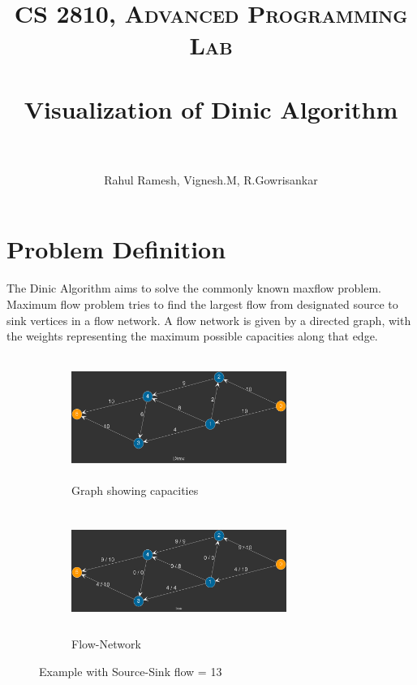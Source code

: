 \documentclass[paper=a4, fontsize=11pt]{scrartcl} %
\title{	
\normalfont \normalsize 
\textsc{CS 2810, Advanced Programming Lab} \\ [25pt] %
\horrule{0.5pt} \\[0.4cm] %
\huge Visualization of Dinic Algorithm\\ %
\horrule{2pt} \\[0.5cm] %
}
\author{Rahul Ramesh, Vignesh.M, R.Gowrisankar} %
\date{} %
\numberwithin{equation}{section} %
\numberwithin{figure}{section} %
\numberwithin{table}{section} %
\begin{document}
\maketitle %


\section{Problem Definition}

The Dinic Algorithm aims to solve the commonly known maxflow problem. Maximum flow problem tries to find the largest flow from designated source to sink vertices in a flow network. A flow network is given by a directed graph, with the weights representing the maximum possible capacities along that edge.

\begin{figure}[h]
\begin{subfigure}{0.5\textwidth}
\includegraphics[width=7cm, height=4cm,center]{p1.png}
\caption{Graph showing capacities}
\label{fig:subim1}
\end{subfigure}
\begin{subfigure}{0.5\textwidth}
\includegraphics[width=7cm, height=4cm,center]{p4.png}
\caption{Flow-Network}
\label{fig:subim2}
\end{subfigure}

\caption{Example with Source-Sink flow = 13}
\label{fig:image2}
\end{figure}
\end{document}
